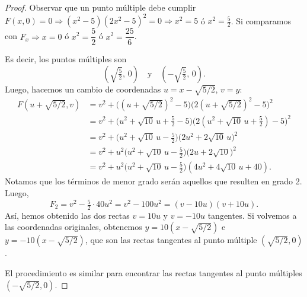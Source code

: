 \documentclass[12pt,a4paper]{article}
\theoremstyle{plain}
\begin{document}
\begin{proof}
	Observar que un punto múltiple debe cumplir $F(x,0)=0\Rightarrow(x^2-5)(2x^2-5)^2=0\Rightarrow x^2=5$ ó $x^2=\tfrac{5}{2}$. Si comparamos con $F_x\Rightarrow x=0$ ó $x^2=\dfrac{5}{2}$ ó $x^2=\dfrac{25}{6}$.

	Es decir, los puntos múltiples son
	\[
	  \left(\sqrt{\tfrac{5}{2}},\,0\right)\quad\text{y}\quad\left(-\sqrt{\tfrac{5}{2}},\,0\right).
	\]
	Luego, hacemos un cambio de coordenadas $u=x-\sqrt{5/2}$, $v=y$:
	\begin{align*}
	  F(u+\sqrt{5/2},v) &= v^2+\bigl((u+\sqrt{5/2})^2-5\bigr)\bigl(2(u+\sqrt{5/2})^2-5\bigr)^2\\
	  &= v^2+\bigl(u^2+\sqrt{10}\,u+\tfrac{5}{2}-5\bigr)\bigl(2(u^2+\sqrt{10}\,u+\tfrac{5}{2})-5\bigr)^2\\
	  &= v^2+\bigl(u^2+\sqrt{10}\,u-\tfrac{5}{2}\bigr)\bigl(2u^2+2\sqrt{10}\,u\bigr)^2\\
	  &= v^2+u^2\bigl(u^2+\sqrt{10}\,u-\tfrac{5}{2}\bigr)\bigl(2u+2\sqrt{10}\bigr)^2\\
	  &= v^2+u^2\bigl(u^2+\sqrt{10}\,u-\tfrac{5}{2}\bigr)(4u^2+4\sqrt{10}\,u+40).
	\end{align*}
	Notamos que los términos de menor grado serán aquellos que resulten en grado 2. Luego,
	\[
	  F_2 = v^2-\tfrac{5}{2}\cdot 40u^2 = v^2-100u^2=(v-10u)(v+10u).
	\]
	Así, hemos obtenido las dos rectas $v = 10u$ y $v = -10u$ tangentes. Si volvemos a las coordenadas originales, obtenemos $y = 10(x - \sqrt{5 \slash 2})$ e $y = -10(x - \sqrt{5 \slash 2})$, que son las rectas tangentes al punto múltiple $(\sqrt{5 \slash 2}, 0)$. \par
	El procedimiento es similar para encontrar las rectas tangentes al punto múltiples $(-\sqrt{5 \slash 2}, 0)$.
\end{proof}
\end{document}
